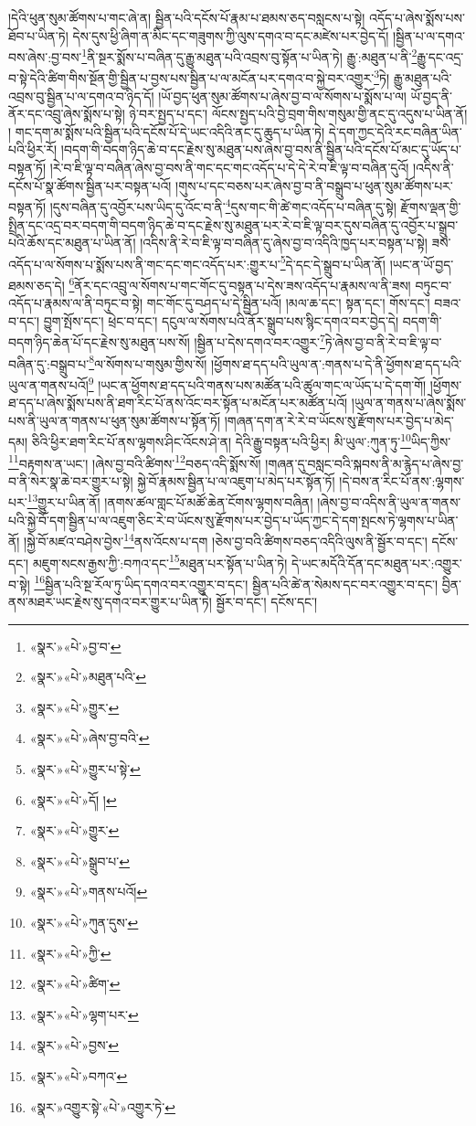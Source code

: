 །དེའི་ཕུན་སུམ་ཚོགས་པ་གང་ཞེ་ན། སྦྱིན་པའི་དངོས་པོ་རྣམ་པ་ཐམས་ཅད་བསླངས་པ་སྟེ། འདོད་པ་ཞེས་སྨོས་པས་ཐོབ་པ་ཡིན་ཏེ། དེས་དུས་ཕྱི་ཞིག་ན་མིང་དང་གཟུགས་ཀྱི་ལུས་དགའ་བ་དང་མཛེས་པར་བྱེད་དོ། །སྦྱིན་པ་ལ་དགའ་བས་ཞེས་:བྱ་བས་\footnote{«སྣར་»«པེ་»བྱ་བ་}ནི་སྔར་སྨོས་པ་བཞིན་དུ་རྒྱུ་མཐུན་པའི་འབྲས་བུ་སྟོན་པ་ཡིན་ཏེ། རྒྱུ་:མཐུན་པ་ནི་\footnote{«སྣར་»«པེ་»མཐུན་པའི་}རྒྱུ་དང་འདྲ་བ་སྟེ་དེའི་ཚིག་གིས་སྔོན་གྱི་སྦྱིན་པ་བྱས་པས་སྦྱིན་པ་ལ་མངོན་པར་དགའ་བ་སྐྱེ་བར་འགྱུར་\footnote{«སྣར་»«པེ་»གྱུར་}ཏེ། རྒྱུ་མཐུན་པའི་འབྲས་བུ་སྦྱིན་པ་ལ་དགའ་བ་ཉིད་དོ། །ཡོ་བྱད་ཕུན་སུམ་ཚོགས་པ་ཞེས་བྱ་བ་ལ་སོགས་པ་སྨོས་པ་ལ། ཡོ་བྱད་ནི་ནོར་དང་འབྲུ་ཞེས་སྨོས་པ་སྟེ། ཉེ་བར་སྤྱད་པ་དང་། ལོངས་སྤྱད་པའི་བྱེ་བྲག་གིས་གསུམ་གྱི་ནང་དུ་འདུས་པ་ཡིན་ནོ། །
གང་དག་མ་སྨོས་པའི་སྦྱིན་པའི་དངོས་པོ་དེ་ཡང་འདིའི་ནང་དུ་ཆུད་པ་ཡིན་ཏེ། དེ་དག་ཀྱང་དེའི་རང་བཞིན་ཡིན་པའི་ཕྱིར་རོ། །བདག་གི་བདག་ཉིད་ཆེ་བ་དང་རྗེས་སུ་མཐུན་པས་ཞེས་བྱ་བས་ནི་སྦྱིན་པའི་དངོས་པོ་མང་དུ་ཡོད་པ་བསྟན་ཏོ། །རེ་བ་ཇི་ལྟ་བ་བཞིན་ཞེས་བྱ་བས་ནི་གང་དང་གང་འདོད་པ་དེ་དེ་རེ་བ་ཇི་ལྟ་བ་བཞིན་དུའོ། །འདིས་ནི་དངོས་པོ་སྣ་ཚོགས་སྦྱིན་པར་བསྟན་པའོ། །གུས་པ་དང་བཅས་པར་ཞེས་བྱ་བ་ནི་བསྒྲུབ་པ་ཕུན་སུམ་ཚོགས་པར་བསྟན་ཏོ། །དུས་བཞིན་དུ་འབྱོར་པས་ཡིད་དུ་འོང་བ་ནི་\footnote{«སྣར་»«པེ་»ཞེས་བྱ་བའི་}དུས་གང་གི་ཚེ་གང་འདོད་པ་བཞིན་དུ་སྟེ། རྫོགས་ལྡན་གྱི་སྤྲིན་དང་འདྲ་བར་བདག་གི་བདག་ཉིད་ཆེ་བ་དང་རྗེས་སུ་མཐུན་པར་རེ་བ་ཇི་ལྟ་བར་དུས་བཞིན་དུ་འབྱོར་པ་སྒྲུབ་པའི་ཆོས་དང་མཐུན་པ་ཡིན་ནོ། །འདིས་ནི་རེ་བ་ཇི་ལྟ་བ་བཞིན་དུ་ཞེས་བྱ་བ་འདིའི་ཁྱད་པར་བསྟན་པ་སྟེ། ཟས་འདོད་པ་ལ་སོགས་པ་སྨོས་པས་ནི་གང་དང་གང་འདོད་པར་:གྱུར་པ་\footnote{«སྣར་»«པེ་»གྱུར་པ་སྟེ་}དེ་དང་དེ་སྒྲུབ་པ་ཡིན་ནོ། །ཡང་ན་ཡོ་བྱད་ཐམས་ཅད་དེ། \footnote{«སྣར་»«པེ་»དོ། ། }ནོར་དང་འབྲུ་ལ་སོགས་པ་གང་གོང་དུ་བསྟན་པ་དེས་ཟས་འདོད་པ་རྣམས་ལ་ནི་ཟས། བཏུང་བ་འདོད་པ་རྣམས་ལ་ནི་བཏུང་བ་སྟེ། གང་གོང་དུ་བཤད་པ་དེ་སྦྱིན་པའོ། །མལ་ཆ་དང་། སྟན་དང་། གོས་དང་། བཟའ་བ་དང་། བྱུག་སྤོས་དང་། ཕྲེང་བ་དང་། དངུལ་ལ་སོགས་པའི་ནོར་སྒྲུབ་པས་སྙིང་དགའ་བར་བྱེད་དེ། བདག་གི་བདག་ཉིད་ཆེན་པོ་དང་རྗེས་སུ་མཐུན་པས་སོ། །སྦྱིན་པ་དེས་དགའ་བར་འགྱུར་\footnote{«སྣར་»«པེ་»གྱུར་}ཏེ་ཞེས་བྱ་བ་ནི་རེ་བ་ཇི་ལྟ་བ་བཞིན་དུ་:བསྒྲུབ་པ་\footnote{«སྣར་»«པེ་»སྒྲུབ་པ་}ལ་སོགས་པ་གསུམ་གྱིས་སོ། །ཕྱོགས་ཐ་དད་པའི་ཡུལ་ན་:གནས་པ་དེ་ནི་ཕྱོགས་ཐ་དད་པའི་ཡུལ་ན་གནས་པའོ།\footnote{«སྣར་»«པེ་»གནས་པའོ།} །ཡང་ན་ཕྱོགས་ཐ་དད་པའི་གནས་པས་མཚོན་པའི་ཚུལ་གང་ལ་ཡོད་པ་དེ་དག་གོ། །ཕྱོགས་ཐ་དད་པ་ཞེས་སྨོས་པས་ནི་ཐག་རིང་པོ་ནས་འོང་བར་སྟོན་པ་མངོན་པར་མཚོན་པའོ། །ཡུལ་ན་གནས་པ་ཞེས་སྨོས་པས་ནི་ཡུལ་ན་གནས་པ་ཕུན་སུམ་ཚོགས་པ་སྟོན་ཏོ། །གཞན་དག་ན་རེ་རེ་བ་ཡོངས་སུ་རྫོགས་པར་བྱེད་པ་མེད་དམ། ཅིའི་ཕྱིར་ཐག་རིང་པོ་ནས་ལྷགས་ཤིང་འོངས་ཤེ་ན། དེའི་རྒྱུ་བསྟན་པའི་ཕྱིར། མི་ཡུལ་:ཀུན་ཏུ་\footnote{«སྣར་»«པེ་»ཀུན་དུས་}ཡིད་ཀྱིས་\footnote{«སྣར་»«པེ་»ཀྱི་}བརྟགས་ན་ཡང་། །ཞེས་བྱ་བའི་ཚིགས་\footnote{«སྣར་»«པེ་»ཚིག་}བཅད་འདི་སྨོས་སོ། །གཞན་དུ་བསླང་བའི་སྐབས་ནི་མ་རྙེད་པ་ཞེས་བྱ་བ་ནི་སེར་སྣ་ཆེ་བར་གྱུར་པ་སྟེ། སྐྱེ་བོ་རྣམས་སྦྱིན་པ་ལ་འཇུག་པ་མེད་པར་སྟོན་ཏོ། །དེ་བས་ན་རིང་པོ་ནས་:ལྷགས་པར་\footnote{«སྣར་»«པེ་»ལྷག་པར་}གྱུར་པ་ཡིན་ནོ། །ནགས་ཚལ་གླང་པོ་མཚོ་ཆེན་ངོགས་ལྷགས་བཞིན། །ཞེས་བྱ་བ་འདིས་ནི་ཡུལ་ན་གནས་པའི་སྐྱེ་བོ་དག་སྦྱིན་པ་ལ་འཇུག་ཅིང་རེ་བ་ཡོངས་སུ་རྫོགས་པར་བྱེད་པ་ཡོད་ཀྱང་དེ་དག་སྤངས་ཏེ་ལྷགས་པ་ཡིན་ནོ། །སྐྱེ་བོ་མཛའ་བཤེས་བྱེས་\footnote{«སྣར་»«པེ་»བྱས་}ནས་འོངས་པ་དག །ཅེས་བྱ་བའི་ཚིགས་བཅད་འདིའི་ལུས་ནི་སྦྱོར་བ་དང་། དངོས་དང་། མཇུག་སངས་རྒྱས་ཀྱི་:བཀའ་དང་\footnote{«སྣར་»«པེ་»བཀའ་}མཐུན་པར་སྟོན་པ་ཡིན་ཏེ། དེ་ཡང་མདོའི་དོན་དང་མཐུན་པར་:འགྱུར་བ་སྟེ། \footnote{«སྣར་»འགྱུར་སྟེ་«པེ་»འགྱུར་ཏེ་}སྦྱིན་པའི་སྔ་རོལ་ཏུ་ཡིད་དགའ་བར་འགྱུར་བ་དང་། སྦྱིན་པའི་ཚེ་ན་སེམས་དང་བར་འགྱུར་བ་དང་། བྱིན་ནས་མཐར་ཡང་རྗེས་སུ་དགའ་བར་གྱུར་པ་ཡིན་ཏེ། སྦྱོར་བ་དང་། དངོས་དང་། 